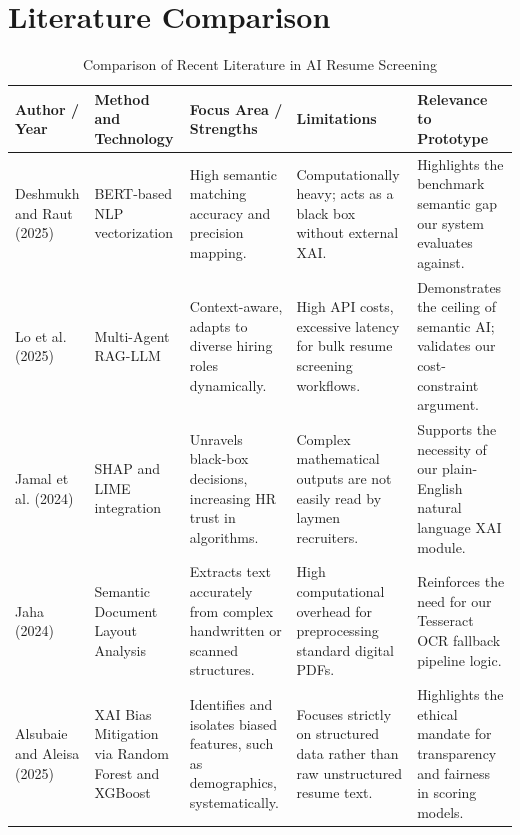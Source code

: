 \section{Literature Comparison}
\begin{table}[H]
\centering
\caption{Comparison of Recent Literature in AI Resume Screening}
\begin{tabularx}{\textwidth}{p{}Y Y Y Y}
\toprule
\textbf{Author / Year} & \textbf{Method and Technology} & \textbf{Focus Area / Strengths} & \textbf{Limitations} & \textbf{Relevance to Prototype}\\
\midrule
Deshmukh and Raut (2025) & BERT-based NLP vectorization & High semantic matching accuracy and precision mapping. & Computationally heavy; acts as a black box without external XAI. & Highlights the benchmark semantic gap our system evaluates against.\\
Lo et al. (2025) & Multi-Agent RAG-LLM & Context-aware, adapts to diverse hiring roles dynamically. & High API costs, excessive latency for bulk resume screening workflows. & Demonstrates the ceiling of semantic AI; validates our cost-constraint argument.\\
Jamal et al. (2024) & SHAP and LIME integration & Unravels black-box decisions, increasing HR trust in algorithms. & Complex mathematical outputs are not easily read by laymen recruiters. & Supports the necessity of our plain-English natural language XAI module.\\
Jaha (2024) & Semantic Document Layout Analysis & Extracts text accurately from complex handwritten or scanned structures. & High computational overhead for preprocessing standard digital PDFs. & Reinforces the need for our Tesseract OCR fallback pipeline logic.\\
Alsubaie and Aleisa (2025) & XAI Bias Mitigation via Random Forest and XGBoost & Identifies and isolates biased features, such as demographics, systematically. & Focuses strictly on structured data rather than raw unstructured resume text. & Highlights the ethical mandate for transparency and fairness in scoring models.\\
\bottomrule
\end{tabularx}
\end{table}

